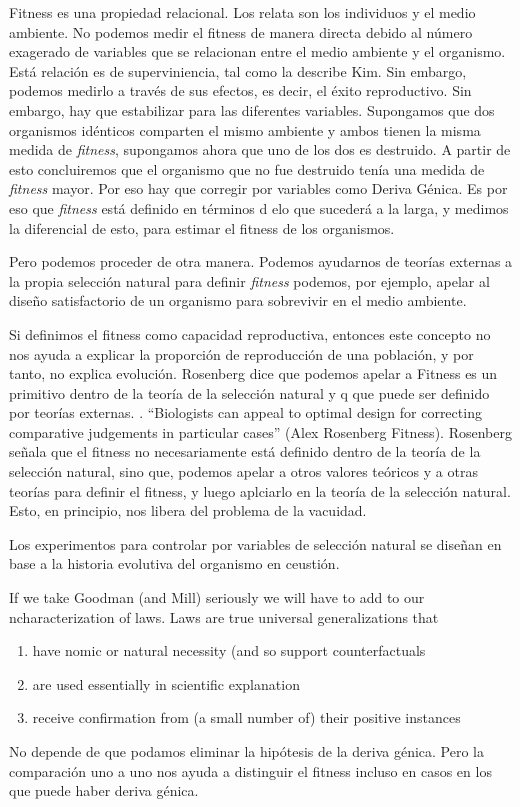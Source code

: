 Fitness es una propiedad relacional. Los relata son los individuos y el medio ambiente. No podemos medir el fitness de manera directa debido al número exagerado de variables que se relacionan entre el medio ambiente y el organismo. Está relación es de superviniencia, tal como la describe Kim. Sin embargo, podemos medirlo a través de sus efectos, es decir, el éxito reproductivo. Sin embargo, hay que estabilizar para las diferentes variables. Supongamos que dos organismos idénticos comparten el mismo ambiente y ambos tienen la misma medida de \emph{fitness}, supongamos ahora que uno de los dos es destruido. A partir de esto concluiremos que el organismo que no fue destruido tenía una medida de \emph{fitness} mayor. Por eso hay que corregir por variables como Deriva Génica. Es por eso que \emph{fitness} está definido en términos d elo que sucederá a la larga, y medimos la diferencial de esto, para estimar el fitness de los organismos.

Pero podemos proceder de otra manera. Podemos ayudarnos de teorías externas a la propia selección natural para definir \emph{fitness} podemos, por ejemplo, apelar al diseño satisfactorio de un organismo para sobrevivir en el medio ambiente.

Si definimos el fitness como capacidad reproductiva, entonces este concepto no nos ayuda a explicar la proporción de reproducción de una población, y por tanto, no explica evolución. Rosenberg dice que podemos apelar a Fitness es un primitivo dentro de la teoría de la selección natural y q  que puede ser definido por teorías externas. . ``Biologists can appeal to optimal design for correcting comparative judgements in particular cases'' (Alex Rosenberg Fitness). Rosenberg señala que el fitness no necesariamente está definido dentro de la teoría de la selección natural, sino que, podemos apelar a otros valores teóricos y a otras teorías para definir el fitness, y luego aplciarlo en la teoría de la selección natural. Esto, en principio, nos libera del problema de la vacuidad.

Los experimentos para controlar por variables de selección natural se diseñan en base a la historia evolutiva del organismo en ceustión.


If we take Goodman (and Mill) seriously we will have to add to our ncharacterization of laws. Laws are true universal generalizations that

\begin{enumerate}
  \item have nomic or natural necessity (and so support counterfactuals
  \item are used essentially in scientific explanation
  \item receive confirmation from (a small number of) their positive instances
  \end{enumerate}

No depende de que podamos eliminar la hipótesis de la deriva génica. Pero la comparación uno a uno nos ayuda a distinguir el fitness incluso en casos en los que puede haber deriva génica.
